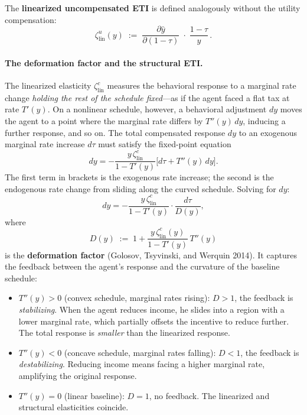 \documentclass[12pt,a4paper]{article}
\theoremstyle{definition}
\theoremstyle{plain}
\theoremstyle{remark}
\begin{document}
The \textbf{linearized uncompensated ETI} is defined analogously without
the utility compensation:
\[
  \zeta^u_{\mathrm{lin}}(y)
  \;:=\;
  \frac{\partial \hat{y}}{\partial (1-\tau)}
  \;\cdot\;
  \frac{1-\tau}{y}\,.
\]

\paragraph{The deformation factor and the structural ETI.}
\label{par:deformation}

The linearized elasticity $\zeta^c_{\mathrm{lin}}$ measures the behavioral response to a marginal rate change \emph{holding the rest of the schedule fixed}---as if the agent faced a flat tax at rate $T'(y)$. On a nonlinear schedule, however, a behavioral adjustment $dy$ moves the agent to a point where the marginal rate differs by $T''(y)\,dy$, inducing a further response, and so on. The total compensated response $dy$ to an exogenous marginal rate increase $d\tau$ must satisfy the fixed-point equation
\begin{equation}
\label{eq:fixed-point}
  dy = -\frac{y\,\zeta^c_{\mathrm{lin}}}{1-T'(y)}\bigl[d\tau + T''(y)\,dy\bigr].
\end{equation}
The first term in brackets is the exogenous rate increase; the second is the endogenous rate change from sliding along the curved schedule. Solving for $dy$:
\begin{equation}
\label{eq:dy-deformation}
  dy = -\frac{y\,\zeta^c_{\mathrm{lin}}}{1-T'(y)}\cdot\frac{d\tau}{D(y)},
\end{equation}
where
\begin{equation}
\label{eq:D-def}
  \boxed{D(y) \;:=\; 1 + \frac{y\,\zeta^c_{\mathrm{lin}}(y)}{1-T'(y)}\,T''(y)}
\end{equation}
is the \textbf{deformation factor} (Golosov, Tsyvinski, and Werquin 2014). It captures the feedback between the agent's response and the curvature of the baseline schedule:
\begin{itemize}[leftmargin=2em]
  \item $T''(y) > 0$ (convex schedule, marginal rates rising): $D > 1$, the feedback is \emph{stabilizing}. When the agent reduces income, he slides into a region with a lower marginal rate, which partially offsets the incentive to reduce further. The total response is \emph{smaller} than the linearized response.
  \item $T''(y) < 0$ (concave schedule, marginal rates falling): $D < 1$, the feedback is \emph{destabilizing}. Reducing income means facing a higher marginal rate, amplifying the original response.
  \item $T''(y) = 0$ (linear baseline): $D = 1$, no feedback. The linearized and structural elasticities coincide.
\end{itemize}
\end{document}

